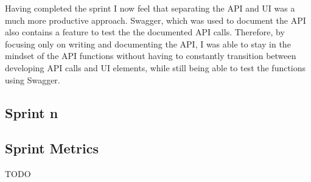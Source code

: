   Having completed the sprint I now feel that separating the API and UI was a much more productive approach. Swagger, which was used to document the API also contains a feature to test the the documented API calls. Therefore, by focusing only on writing and documenting the API, I was able to stay in the mindset of the API functions without having to constantly transition between developing API calls and UI elements, while still being able to test the functions using Swagger.
  
   

	\subsection{Sprint n}

	\subsection{Sprint Metrics}
	TODO

	